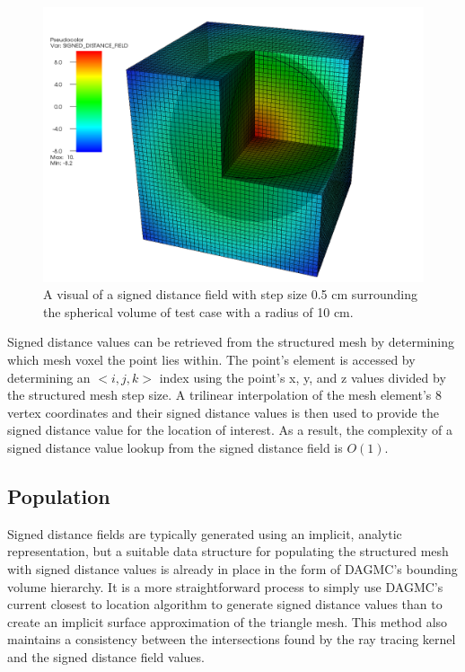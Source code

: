 \begin{figure}
  \centering
  \includegraphics[scale=0.35]{../images/sdf_sphere.png}
  \caption{A visual of a signed distance field with step size 0.5 cm surrounding
    the spherical volume of test case with a radius of 10 cm.}
  \label{fig:sdf_sphere}
\end{figure}

Signed distance values can be retrieved from the structured mesh by determining
which mesh voxel the point lies within. The point's element is accessed by
determining an $<i,j,k>$ index using the point's x, y, and z values divided by
the structured mesh step size. A trilinear interpolation of the mesh element's 8
vertex coordinates and their signed distance values is then used to provide the
signed distance value for the location of interest. As a result, the complexity
of a signed distance value lookup from the signed distance field is
$O(1)$.

\subsection{Population}

Signed distance fields are typically generated using an implicit, analytic
representation, but a suitable data structure for populating the structured mesh
with signed distance values is already in place in the form of DAGMC's bounding
volume hierarchy. It is a more straightforward process to simply use DAGMC's
current closest to location algorithm to generate signed distance values than to
create an implicit surface approximation of the triangle mesh. This method also
maintains a consistency between the intersections found by the ray tracing
kernel and the signed distance field values.

